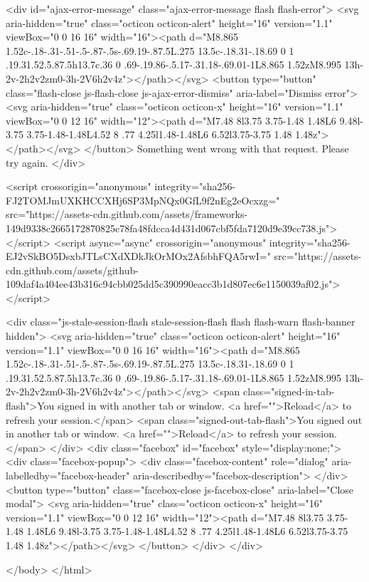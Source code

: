     

    <div id="ajax-error-message" class="ajax-error-message flash flash-error">
      <svg aria-hidden="true" class="octicon octicon-alert" height="16" version="1.1" viewBox="0 0 16 16" width="16"><path d="M8.865 1.52c-.18-.31-.51-.5-.87-.5s-.69.19-.87.5L.275 13.5c-.18.31-.18.69 0 1 .19.31.52.5.87.5h13.7c.36 0 .69-.19.86-.5.17-.31.18-.69.01-1L8.865 1.52zM8.995 13h-2v-2h2v2zm0-3h-2V6h2v4z"></path></svg>
      <button type="button" class="flash-close js-flash-close js-ajax-error-dismiss" aria-label="Dismiss error">
        <svg aria-hidden="true" class="octicon octicon-x" height="16" version="1.1" viewBox="0 0 12 16" width="12"><path d="M7.48 8l3.75 3.75-1.48 1.48L6 9.48l-3.75 3.75-1.48-1.48L4.52 8 .77 4.25l1.48-1.48L6 6.52l3.75-3.75 1.48 1.48z"></path></svg>
      </button>
      Something went wrong with that request. Please try again.
    </div>


      
      <script crossorigin="anonymous" integrity="sha256-FJ2TOMJmUXKHCCXHj6SP3MpNQx0GfL9f2nEg2eOcxzg=" src="https://assets-cdn.github.com/assets/frameworks-149d9338c2665172870825c78fa48fdcca4d431d067cbf5fda7120d9e39cc738.js"></script>
      <script async="async" crossorigin="anonymous" integrity="sha256-EJ2vSkBO5DsxbJTLsCXdXDkJkOrMOx2AfsbhFQA5rwI=" src="https://assets-cdn.github.com/assets/github-109daf4a404ee43b316c94cbb025dd5c390990eacc3b1d807ec6e1150039af02.js"></script>
      
      
      
      
      
      
    <div class="js-stale-session-flash stale-session-flash flash flash-warn flash-banner hidden">
      <svg aria-hidden="true" class="octicon octicon-alert" height="16" version="1.1" viewBox="0 0 16 16" width="16"><path d="M8.865 1.52c-.18-.31-.51-.5-.87-.5s-.69.19-.87.5L.275 13.5c-.18.31-.18.69 0 1 .19.31.52.5.87.5h13.7c.36 0 .69-.19.86-.5.17-.31.18-.69.01-1L8.865 1.52zM8.995 13h-2v-2h2v2zm0-3h-2V6h2v4z"></path></svg>
      <span class="signed-in-tab-flash">You signed in with another tab or window. <a href="">Reload</a> to refresh your session.</span>
      <span class="signed-out-tab-flash">You signed out in another tab or window. <a href="">Reload</a> to refresh your session.</span>
    </div>
    <div class="facebox" id="facebox" style="display:none;">
  <div class="facebox-popup">
    <div class="facebox-content" role="dialog" aria-labelledby="facebox-header" aria-describedby="facebox-description">
    </div>
    <button type="button" class="facebox-close js-facebox-close" aria-label="Close modal">
      <svg aria-hidden="true" class="octicon octicon-x" height="16" version="1.1" viewBox="0 0 12 16" width="12"><path d="M7.48 8l3.75 3.75-1.48 1.48L6 9.48l-3.75 3.75-1.48-1.48L4.52 8 .77 4.25l1.48-1.48L6 6.52l3.75-3.75 1.48 1.48z"></path></svg>
    </button>
  </div>
</div>

  </body>
</html>

